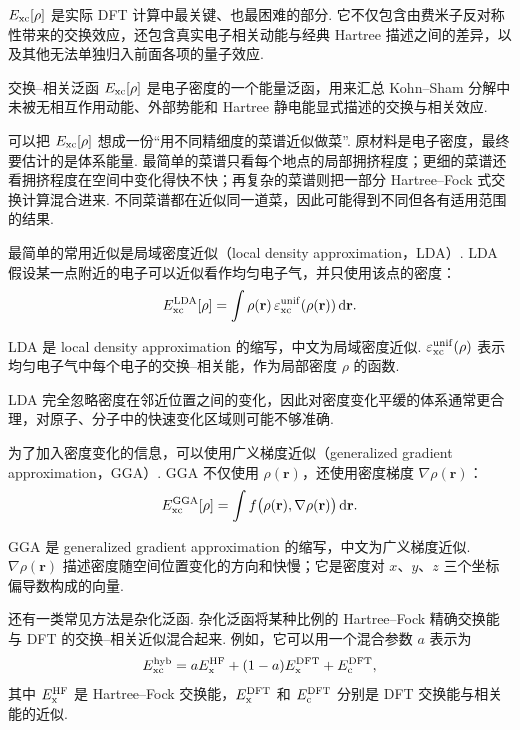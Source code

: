 \documentclass[UTF8,11pt,a4paper,openany]{ctexbook}
\newcommand{\dd}{\,\mathrm d}\newcommand{\Ham}{\hat H}\newcommand{\tr}{\operatorname{Tr}}
\begin{document}
$E_{\rm xc}[\rho]$ 是实际 DFT 计算中最关键、也最困难的部分. 它不仅包含由费米子反对称性带来的交换效应，还包含真实电子相关动能与经典 Hartree 描述之间的差异，以及其他无法单独归入前面各项的量子效应. 

\begin{definitionbox}
交换--相关泛函 $E_{\rm xc}[\rho]$ 是电子密度的一个能量泛函，用来汇总 Kohn--Sham 分解中未被无相互作用动能、外部势能和 Hartree 静电能显式描述的交换与相关效应. 
\end{definitionbox}

\begin{analogybox}
可以把 $E_{\rm xc}[\rho]$ 想成一份“用不同精细度的菜谱近似做菜”. 原材料是电子密度，最终要估计的是体系能量. 最简单的菜谱只看每个地点的局部拥挤程度；更细的菜谱还看拥挤程度在空间中变化得快不快；再复杂的菜谱则把一部分 Hartree--Fock 式交换计算混合进来. 不同菜谱都在近似同一道菜，因此可能得到不同但各有适用范围的结果. 
\end{analogybox}

最简单的常用近似是局域密度近似（local density approximation，LDA）. LDA 假设某一点附近的电子可以近似看作均匀电子气，并只使用该点的密度：
\[
E_{\rm xc}^{\rm LDA}[\rho]
=
\int
\rho(\mathbf r)\,
\varepsilon_{\rm xc}^{\rm unif}(\rho(\mathbf r))
\dd\mathbf r.
\]

\begin{notationbox}
LDA 是 local density approximation 的缩写，中文为局域密度近似. $\varepsilon_{\rm xc}^{\rm unif}(\rho)$ 表示均匀电子气中每个电子的交换--相关能，作为局部密度 $\rho$ 的函数. 
\end{notationbox}

LDA 完全忽略密度在邻近位置之间的变化，因此对密度变化平缓的体系通常更合理，对原子、分子中的快速变化区域则可能不够准确. 

为了加入密度变化的信息，可以使用广义梯度近似（generalized gradient approximation，GGA）. GGA 不仅使用 $\rho(\mathbf r)$，还使用密度梯度 $\nabla\rho(\mathbf r)$：
\[
E_{\rm xc}^{\rm GGA}[\rho]
=
\int
f\bigl(\rho(\mathbf r),\nabla\rho(\mathbf r)\bigr)
\dd\mathbf r.
\]

\begin{notationbox}
GGA 是 generalized gradient approximation 的缩写，中文为广义梯度近似. $\nabla\rho(\mathbf r)$ 描述密度随空间位置变化的方向和快慢；它是密度对 $x$、$y$、$z$ 三个坐标偏导数构成的向量. 
\end{notationbox}

还有一类常见方法是杂化泛函. 杂化泛函将某种比例的 Hartree--Fock 精确交换能与 DFT 的交换--相关近似混合起来. 例如，它可以用一个混合参数 $a$ 表示为
\[
E_{\rm xc}^{\rm hyb}
=
aE_{\rm x}^{\rm HF}
+
(1-a)E_{\rm x}^{\rm DFT}
+
E_{\rm c}^{\rm DFT},
\]
其中 $E_{\rm x}^{\rm HF}$ 是 Hartree--Fock 交换能，$E_{\rm x}^{\rm DFT}$ 和 $E_{\rm c}^{\rm DFT}$ 分别是 DFT 交换能与相关能的近似. 
\end{document}
